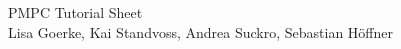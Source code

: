 \documentclass{article}
\begin{document}
\begin{center}
\LARGE PMPC Tutorial Sheet \TutorialSheetNumber\\
\small Lisa Goerke, Kai Standvoss, Andrea Suckro, Sebastian H\"offner
\end{center}
\vspace{0.5cm}
\normalsize
\end{document}
